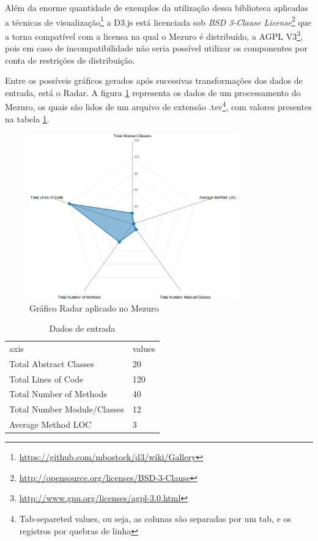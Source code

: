 Além da enorme quantidade de exemplos da utilização dessa biblioteca aplicadas a técnicas de visualização\footnote{\url{https://github.com/mbostock/d3/wiki/Gallery}} a D3.js está licenciada sob \textit{BSD 3-Clause License}\footnote{\url{http://opensource.org/licenses/BSD-3-Clause}} que a torna compatível com a licensa na qual o Mezuro é distribuído, a AGPL V3\footnote{\url{http://www.gnu.org/licenses/agpl-3.0.html}}, pois em caso de incompatibilidade não seria possível utilizar os componentes por conta de restrições de distribuição.

Entre os possíveis gráficos gerados após sucessivas transformações dos dados de entrada, está o Radar. A figura \ref{radar-chart-mezuro} representa os dados de um processamento do Mezuro, os quais são lidos de um arquivo de extensão .tsv\footnote{Tab-separeted values, ou seja, as colunas são separadas por um tab, e os registros por quebras de linha}, com valores presentes na tabela \ref{data-tsv}.

\graphicspath{{figuras/}}
\begin{figure}[h]
\centering
\includegraphics[width=0.8\textwidth]{radar_chart_mezuro}
\caption{Gráfico Radar aplicado no Mezuro}
\label{radar-chart-mezuro}
\end{figure}

\begin{table}[H]
\begin{center}
    \begin{tabular}{ll}
	axis & values \\
	Total Abstract Classes & 20 \\
	Total Lines of Code & 120 \\
	Total Number of Methods & 40 \\
	Total Number Module/Classes & 12 \\
	Average Method LOC & 3 \\
	\end{tabular}
    \caption{Dados de entrada}
    \label{data-tsv}
\end{center}
\end{table}

